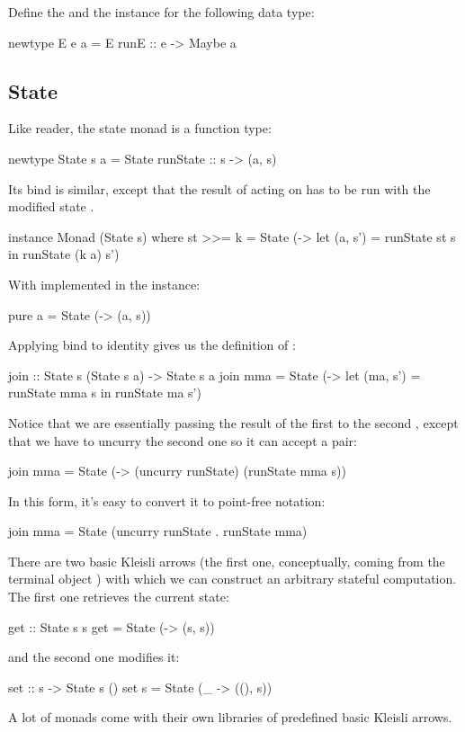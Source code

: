 \documentclass[DaoFP]{subfiles}
\begin{document}
\begin{exercise}
Define the  and the  instance for the following data type:
\begin{haskell}
newtype E e a = E { runE :: e -> Maybe a }
\end{haskell}
\end{exercise}


\subsection{State}
Like reader, the state monad is a function type:
\begin{haskell}
newtype State s a = State { runState :: s -> (a, s) }
\end{haskell}
Its bind is similar, except that the result of  acting on   has to be run with the modified state .
\begin{haskell}
instance Monad (State s) where
  st >>= k = State (\s -> let (a, s') = runState st s
                          in runState (k a) s')
\end{haskell}
With  implemented in the  instance:
\begin{haskell}
  pure a = State (\s -> (a, s))
\end{haskell}

Applying bind to identity gives us the definition of :
\begin{haskell}
join :: State s (State s a) -> State s a
join mma = State (\s -> let (ma, s') = runState mma s
                        in runState ma s')
\end{haskell}
Notice that we are essentially passing the result of the first  to the second , except that we have to uncurry the second one so it can accept a pair:
                             
\begin{haskell}
join mma = State (\s -> (uncurry runState) (runState mma s))
\end{haskell}
In this form, it's easy to convert it to point-free notation:
\begin{haskell}
join mma = State (uncurry runState . runState mma)
\end{haskell}

There are two basic Kleisli arrows (the first one, conceptually, coming from the terminal object \hask{()}) with which we can construct an arbitrary stateful computation. The first one retrieves the current state:
\begin{haskell}
get :: State s s
get = State (\s -> (s, s))
\end{haskell}
and the second one modifies it:
\begin{haskell}
set :: s -> State s ()
set s = State (\_ -> ((), s))
\end{haskell}
A lot of monads come with their own libraries of predefined basic Kleisli arrows.
\end{document}
